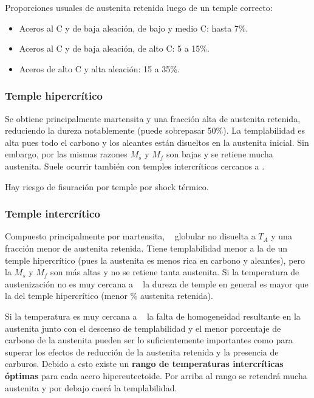 Proporciones usuales de austenita retenida luego de un temple correcto: 
\begin{itemize}
    \item Aceros al C y de baja aleación, de bajo y medio C: hasta 7\%.
    \item Aceros al C y de baja aleación, de alto C: 5 a 15\%.
    \item Aceros de alto C y alta aleación: 15 a 35\%.
\end{itemize}


\subsubsection{Temple hipercrítico}
Se obtiene principalmente martensita y una fracción alta de austenita retenida, reduciendo la dureza notablemente (puede sobrepasar 50\%). La templabilidad es alta pues todo el carbono y los aleantes están disueltos en la austenita inicial. Sin embargo, por las mismas razones $M_s$ y $M_f$ son bajas y se retiene mucha austenita. Suele ocurrir también con temples intercríticos cercanos a \Acm{}.

Hay riesgo de fisuración por temple por shock térmico.

\subsubsection{Temple intercrítico}
Compuesto principalmente por martensita, \cementita~ globular no disuelta a $T_A$ y una fracción menor de austenita retenida. Tiene templabilidad menor a la de un temple hipercrítico (pues la austenita es menos rica en carbono y aleantes), pero la $M_s$ y $M_f$ son más altas y no se retiene tanta austenita. Si la temperatura de austenización no es muy cercana a \Aone~ la dureza de temple en general es mayor que la del temple hipercrítico (menor \% austenita retenida). 

Si la temperatura es muy cercana a \Aone~ la falta de homogeneidad resultante en la austenita junto con el descenso de templabilidad y el menor porcentaje de carbono de la austenita pueden ser lo suficientemente importantes como para superar los efectos de reducción de la austenita retenida y la presencia de carburos. Debido a esto existe un \textbf{rango de temperaturas intercríticas óptimas} para cada acero hipereutectoide. Por arriba al rango se retendrá mucha austenita y por debajo caerá la templabilidad.

